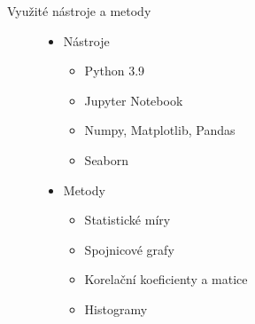 \documentclass[hyperref={unicode}, xcolor={table}]{beamer}
\begin{document}
\begin{frame}[t]{Využité nástroje a metody}
    \begin{figure}
        \small
        \begin{minipage}[t]{0.48\linewidth}
            \begin{itemize}
                \item Nástroje
                \begin{itemize}
                    \item Python 3.9
                    \item Jupyter Notebook
                    \item Numpy, Matplotlib, Pandas
                    \item Seaborn
                \end{itemize}
            \end{itemize}
        \end{minipage}
        \hfill
        \begin{minipage}[t]{0.48\linewidth}
            \begin{itemize}
                \item Metody
                \begin{itemize}
                    \item Statistické míry
                    \item Spojnicové grafy
                    \item Korelační koeficienty a matice
                    \item Histogramy
                \end{itemize}
            \end{itemize}
            
        \end{minipage}
        \vspace{0}
        \begin{minipage}{6.5cm}
            \resizebox{1.0\textwidth}{!}
            {
                
            }
            
        \end{minipage}
        \begin{minipage}{4.5cm}
              
        \end{minipage}
    \end{figure}
\end{frame}
\end{document}
